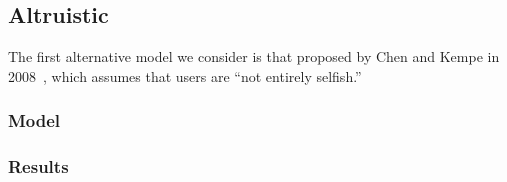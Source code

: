 \subsection{Altruistic}
The first alternative model we consider is that proposed by Chen and Kempe in 2008~\cite{chen}, which assumes that users are ``not entirely selfish.''

\subsubsection{Model}
\subsubsection{Results}
